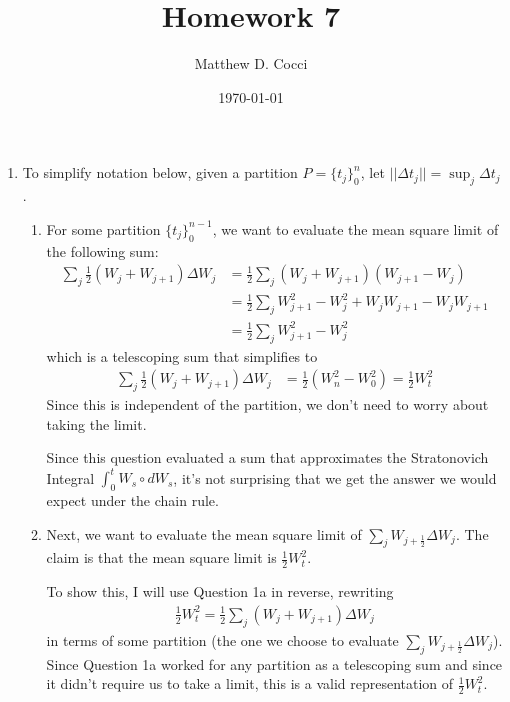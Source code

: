 \documentclass[12pt]{article}
\author{Matthew D. Cocci}
\title{Homework 7}
\date{\today}
\theoremstyle{plain}
\theoremstyle{definition}
\theoremstyle{remark}
\begin{document}
\maketitle



\begin{enumerate}
\item %
  To simplify notation below, given a partition $P= \{t_j\}_0^n$, let
  $||\Delta t_j|| = \sup_j \Delta t_j$.
  \begin{enumerate}
    \item %
      For some partition $\{t_j\}_0^{n-1}$, we want to evaluate the mean
      square limit of the following sum:
      \begin{align*}
        \sum_j \frac{1}{2} (W_j+W_{j+1}) \Delta W_j
        &= \frac{1}{2} \sum_j (W_j+W_{j+1})(W_{j+1}-W_{j}) \\
        &= \frac{1}{2} \sum_j W^2_{j+1}-W^2_{j} + W_j W_{j+1} - W_j W_{j+1}\\
        &= \frac{1}{2} \sum_j W^2_{j+1}-W^2_{j}
      \end{align*}
      which is a telescoping sum that simplifies to
      \begin{align*}
        \sum_j \frac{1}{2} (W_j+W_{j+1}) \Delta W_j
        &= \frac{1}{2} \left( W^2_n-W^2_0\right)
        = \frac{1}{2} W^2_t
      \end{align*}
      Since this is independent of the partition, we don't need to worry
      about taking the limit.

      Since this question evaluated a sum that approximates the
      Stratonovich Integral $\int^t_0 W_s \circ dW_s$, it's not
      surprising that we get the answer we would expect under the chain
      rule.

    \item %
      Next, we want to evaluate the mean square limit of $\sum_j
      W_{j+\frac{1}{2}}\Delta W_j$. The claim is that the mean square
      limit is $\frac{1}{2}W^2_t$.

      To show this, I will use Question 1a in reverse, rewriting
      \begin{align*}
        \frac{1}{2}W_t^2=\frac{1}{2}\sum_j(W_j+W_{j+1})\Delta W_j
      \end{align*}
      in terms of some partition (the one we choose to evaluate $\sum_j
      W_{j+\frac{1}{2}}\Delta W_j$). Since Question 1a worked for any
      partition as a telescoping sum and since it didn't require us to
      take a limit, this is a valid representation of
      $\frac{1}{2}W^2_t$.


\end{enumerate}
\end{enumerate}
\end{document}
